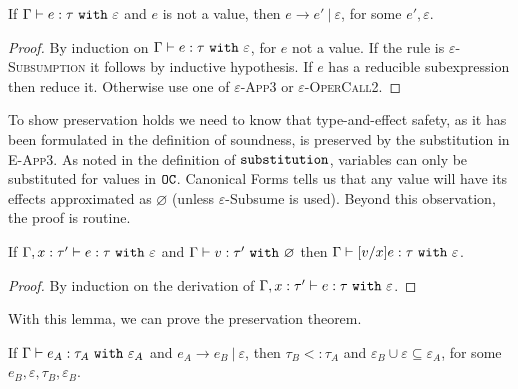 \begin{theorem}
If $ \Gamma \vdash  e:  \tau~\mathtt{with}~ \varepsilon$ and $ e$ is not a value, then $ e \longrightarrow  e'~|~\varepsilon$, for some $e', \varepsilon$.
\end{theorem}

\begin{proof} By induction on $ \Gamma \vdash  e:  \tau~\mathtt{with}~ \varepsilon$, for $ e$ not a value. If the rule is \textsc{$\varepsilon$-Subsumption} it follows by inductive hypothesis. If $e$ has a reducible subexpression then reduce it. Otherwise use one of \textsc{$\varepsilon$-App3} or \textsc{$\varepsilon$-OperCall2}.
\end{proof}

To show preservation holds we need to know that type-and-effect safety, as it has been formulated in the definition of soundness, is preserved by the substitution in \textsc{E-App3}. As noted in the definition of $\mathtt{substitution}$, variables can only be substituted for values in $\mathtt{OC}$. Canonical Forms tells us that any value will have its effects approximated as $\varnothing$ (unless $\varepsilon$-Subsume is used). Beyond this observation, the proof is routine.

\begin{lemma}
If $\Gamma, x: \tau' \vdash e: \tau~\mathtt{with}~ \varepsilon$ and $\Gamma \vdash v: \tau'~\mathtt{with}~ \varnothing$ then $\Gamma \vdash [v/x]e: \tau~\mathtt{with}~ \varepsilon$.
\end{lemma}

\begin{proof} By induction on the derivation of $\Gamma, x: \tau' \vdash e: \tau~\mathtt{with}~ \varepsilon$.
\end{proof}

With this lemma, we can prove the preservation theorem.

\begin{theorem}
If $\Gamma \vdash e_A: \tau_A~\mathtt{with}~ \varepsilon_A$ and $e_A \longrightarrow e_B~|~\varepsilon$, then $\tau_B <: \tau_A$ and $\varepsilon_B \cup \varepsilon \subseteq \varepsilon_A$, for some $e_B, \varepsilon, \tau_B, \varepsilon_B$.
\end{theorem}

